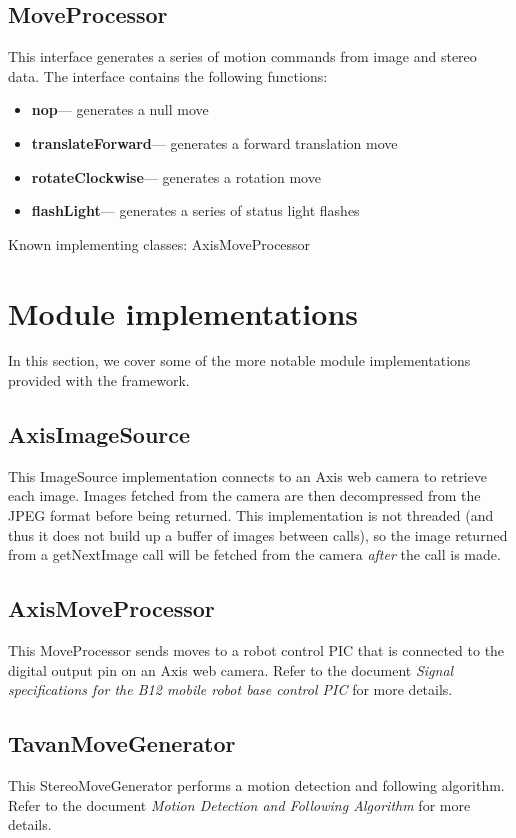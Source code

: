 \documentclass[12pt]{article}
\begin{document}
\subsection{MoveProcessor}
This interface generates a series of motion commands from image and stereo data.  The interface contains the following functions:

\begin{itemize}
\item {\bf nop}--- generates a null move
\item {\bf translateForward}--- generates a forward translation move
\item {\bf rotateClockwise}--- generates a rotation move
\item {\bf flashLight}--- generates a series of status light flashes
\end{itemize}
Known implementing classes:  AxisMoveProcessor

\section{Module implementations}
In this section, we cover some of the more notable module implementations provided with the framework.
\subsection{AxisImageSource}
This ImageSource implementation connects to an Axis web camera to retrieve each image.  Images fetched from the camera are then decompressed from the JPEG format before being returned.  This implementation is not threaded (and thus it does not build up a buffer of images between calls), so the image returned from a getNextImage call will be fetched from the camera {\it after} the call is made.
\subsection{AxisMoveProcessor}
This MoveProcessor sends moves to a robot control PIC that is connected to the digital output pin on an Axis web camera.  Refer to the document {\it Signal specifications for the B12 mobile robot base control PIC} for more details.
\subsection{TavanMoveGenerator}
This StereoMoveGenerator performs a motion detection and following algorithm.  Refer to the document {\it Motion Detection and Following Algorithm} for more details. 
\end{document}
